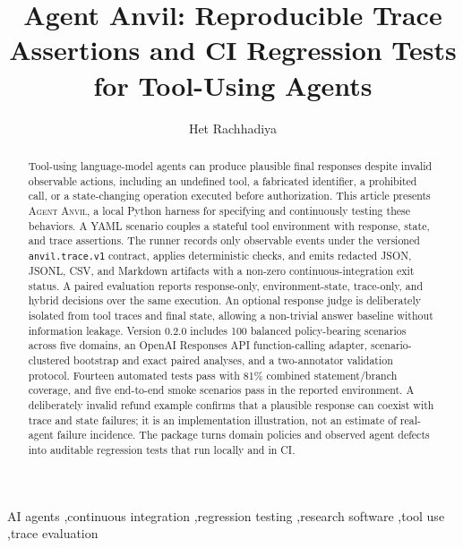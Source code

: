 \documentclass[preprint,12pt]{elsarticle}
\newcommand{\system}{\textsc{Agent Anvil}}
\begin{document}
\begin{frontmatter}

\title{Agent Anvil: Reproducible Trace Assertions and CI Regression Tests for Tool-Using Agents}

\author[aff1]{Het Rachhadiya}
\address[aff1]{Independent Researcher, Bristol, United Kingdom}

\begin{abstract}
Tool-using language-model agents can produce plausible final responses despite invalid observable actions, including an undefined tool, a fabricated identifier, a prohibited call, or a state-changing operation executed before authorization. This article presents \system, a local Python harness for specifying and continuously testing these behaviors. A YAML scenario couples a stateful tool environment with response, state, and trace assertions. The runner records only observable events under the versioned \texttt{anvil.trace.v1} contract, applies deterministic checks, and emits redacted JSON, JSONL, CSV, and Markdown artifacts with a non-zero continuous-integration exit status. A paired evaluation reports response-only, environment-state, trace-only, and hybrid decisions over the same execution. An optional response judge is deliberately isolated from tool traces and final state, allowing a non-trivial answer baseline without information leakage. Version 0.2.0 includes 100 balanced policy-bearing scenarios across five domains, an OpenAI Responses API function-calling adapter, scenario-clustered bootstrap and exact paired analyses, and a two-annotator validation protocol. Fourteen automated tests pass with 81\% combined statement/branch coverage, and five end-to-end smoke scenarios pass in the reported environment. A deliberately invalid refund example confirms that a plausible response can coexist with trace and state failures; it is an implementation illustration, not an estimate of real-agent failure incidence. The package turns domain policies and observed agent defects into auditable regression tests that run locally and in CI.
\end{abstract}

\begin{keyword}
AI agents \sep continuous integration \sep regression testing \sep research software \sep tool use \sep trace evaluation
\end{keyword}

\end{frontmatter}
\end{document}
